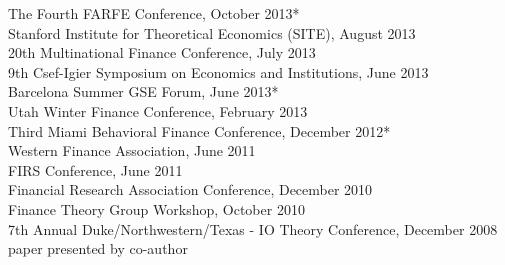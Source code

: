 \documentclass[margin,line,11pt]{resume}
\begin{document}
\begin{resume}
The Fourth FARFE Conference, October 2013* \\ %
Stanford Institute for Theoretical Economics (SITE), August 2013 \\ %
20th Multinational Finance Conference, July 2013 \\ %
9th Csef-Igier Symposium on Economics and Institutions, June 2013 \\ %
Barcelona Summer GSE Forum, June 2013* \\ %
Utah Winter Finance Conference, February 2013 \\ %
Third Miami Behavioral Finance Conference, December 2012* \\ %
Western Finance Association, June 2011 \\ %
FIRS Conference, June 2011  \\ %
Financial Research Association Conference, December 2010 \\ %
Finance Theory Group Workshop, October 2010 \\ %
7th Annual Duke/Northwestern/Texas - IO Theory Conference, December 2008 \\[1pt] %
{\small * paper presented by co-author}



\end{resume}
\end{document}
